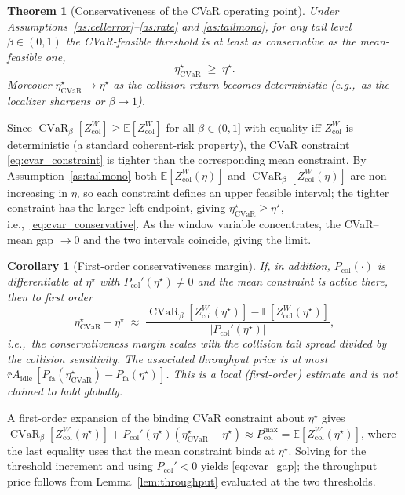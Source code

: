 \documentclass[journal]{IEEEtran}
\newtheorem{theorem}{Theorem}
\newtheorem{corollary}{Corollary}
\newcommand{\E}{\mathbb{E}}
\newcommand{\Pfa}{P_{\mathrm{fa}}}         %
\newcommand{\thr}{\eta}                    %
\newcommand{\Pcol}{P_{\mathrm{col}}}       %
\newcommand{\Pcolmax}{P_{\mathrm{col}}^{\max}} %
\newcommand{\Zcol}{Z_{\mathrm{col}}}        %
\DeclareMathOperator{\CVaR}{CVaR}
\newcommand{\cvarcol}{\beta}                %
\newcommand{\thrcvar}{\thr^{\star}_{\mathrm{CVaR}}} %
\begin{document}
\begin{theorem}[Conservativeness of the CVaR operating point]
\label{thm:cvar}
Under Assumptions~\ref{as:cellerror}--\ref{as:rate} and
\ref{as:tailmono}, for any tail level $\cvarcol\in(0,1)$ the CVaR-feasible
threshold is at least as conservative as the mean-feasible one,
\begin{equation}
\thrcvar \;\ge\; \thr^{\star}.
\label{eq:cvar_conservative}
\end{equation}
Moreover $\thrcvar\to\thr^{\star}$ as the collision return becomes
deterministic (e.g.,\ as the localizer sharpens or $\cvarcol\to1$).
\end{theorem}

\begin{IEEEproof}
Since $\CVaR_{\cvarcol}[\Zcol^{W}]\ge\E[\Zcol^{W}]$ for all
$\cvarcol\in(0,1]$ with equality iff $\Zcol^{W}$ is deterministic (a standard
coherent-risk property), the CVaR constraint \eqref{eq:cvar_constraint} is
tighter than the corresponding mean constraint. By
Assumption~\ref{as:tailmono} both $\E[\Zcol^{W}(\thr)]$ and
$\CVaR_{\cvarcol}[\Zcol^{W}(\thr)]$ are non-increasing in $\thr$, so each
constraint defines an upper feasible interval; the tighter constraint has the
larger left endpoint, giving $\thrcvar\ge\thr^{\star}$, i.e.,~\eqref{eq:cvar_conservative}.
As the window variable concentrates, the
CVaR--mean gap $\to 0$ and the two intervals coincide, giving the limit.
\end{IEEEproof}

\begin{corollary}[First-order conservativeness margin]
\label{cor:cvargap}
If, in addition, $\Pcol(\cdot)$ is differentiable at $\thr^\star$ with
$\Pcol'(\thr^\star)\neq 0$ and the mean constraint is active there, then to
first order
\begin{equation}
\thrcvar-\thr^{\star}\;\approx\;
\frac{\CVaR_{\cvarcol}[\Zcol^{W}(\thr^{\star})]-\E[\Zcol^{W}(\thr^{\star})]}
{\bigl|\Pcol'(\thr^{\star})\bigr|},
\label{eq:cvar_gap}
\end{equation}
i.e.,\ the conservativeness margin scales with the collision tail spread
divided by the collision sensitivity. The associated throughput price is at
most $\bar r A_{\mathrm{idle}}\,[\Pfa(\thrcvar)-\Pfa(\thr^{\star})]$. This is
a local (first-order) estimate and is not claimed to hold globally.
\end{corollary}

\begin{IEEEproof}
A first-order expansion of the binding CVaR constraint about $\thr^{\star}$
gives $\CVaR_{\cvarcol}[\Zcol^{W}(\thr^{\star})]
+\Pcol'(\thr^{\star})(\thrcvar-\thr^{\star})\approx\Pcolmax
=\E[\Zcol^{W}(\thr^{\star})]$, where the last equality uses that the mean
constraint binds at $\thr^{\star}$. Solving for the threshold increment and
using $\Pcol'<0$ yields \eqref{eq:cvar_gap}; the throughput price follows
from Lemma~\ref{lem:throughput} evaluated at the two thresholds.
\end{IEEEproof}
\end{document}
